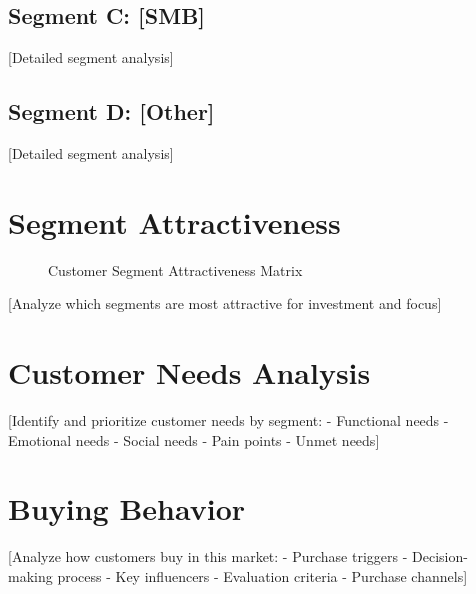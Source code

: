 \documentclass[11pt,letterpaper]{report}
\begin{document}
\subsection{Segment C: [SMB]}
[Detailed segment analysis]

\subsection{Segment D: [Other]}
[Detailed segment analysis]

\section{Segment Attractiveness}


\begin{figure}[htbp]
\centering
\caption{Customer Segment Attractiveness Matrix}
\label{fig:segment_attractiveness}
\end{figure}

[Analyze which segments are most attractive for investment and focus]

\section{Customer Needs Analysis}

[Identify and prioritize customer needs by segment:
- Functional needs
- Emotional needs
- Social needs
- Pain points
- Unmet needs]

\section{Buying Behavior}

[Analyze how customers buy in this market:
- Purchase triggers
- Decision-making process
- Key influencers
- Evaluation criteria
- Purchase channels]

\end{document}
